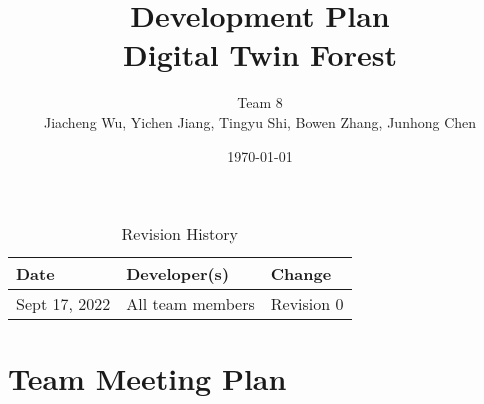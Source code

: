 \documentclass{article}
\title{Development Plan\\ Digital Twin Forest}
\author{Team 8\\Jiacheng Wu, Yichen Jiang, Tingyu Shi, Bowen Zhang, Junhong Chen}
\date{\today}
\begin{document}
 
\maketitle

\begin{table}[hp]
\centering
\caption{Revision History} \label{TblRevisionHistory}
\begin{tabularx}{\textwidth}{XXX}
\toprule
\textbf{Date} & \textbf{Developer(s)} & \textbf{Change}\\
\midrule
Sept 17, 2022 & All team members & Revision 0\\

\bottomrule
\end{tabularx}
\end{table}
\section{Team Meeting Plan}
\end{document}
